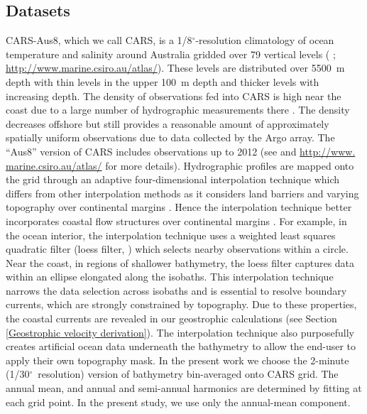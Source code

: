 \documentclass[preprint,3p,review,12pt]{elsarticle}
\newcommand{\dg}{$^{\circ}$}
\begin{document}
\subsection{Datasets} \label{Datasets}
CARS-Aus8, which we call CARS, is a 1/8\dg-resolution climatology of ocean temperature and salinity around Australia gridded over 79 vertical levels (\citeauthor{Ridgway2002} \citeyear{Ridgway2002}; \url{http://www.marine.csiro.au/atlas/}). These levels are distributed over \SI{5500}{\meter} depth with thin levels in the upper \SI{100}{\meter} depth and thicker levels with increasing depth. The density of observations fed into CARS is high near the coast due to a large number of hydrographic measurements there \citep{Ridgway2002}. The density decreases offshore but still provides a reasonable amount of approximately spatially uniform observations due to data collected by the Argo array. The ``Aus8'' version of CARS includes observations up to 2012 (see \citeauthor{Duran2015} \citeyear{Duran2015} and \url{http://www. marine.csiro.au/atlas/} for more details). Hydrographic profiles are mapped onto the grid through an adaptive four-dimensional interpolation technique which differs from other interpolation methods as it considers land barriers and varying topography over continental margins \citep{Ridgway2002}. Hence the interpolation technique better incorporates coastal flow structures over continental margins \citep{Ridgway2002}. For example, in the ocean interior, the interpolation technique uses a weighted least squares quadratic filter (loess filter, \citeauthor{Cleveland1988} \citeyear{Cleveland1988}) which selects nearby observations within a circle. Near the coast, in regions of shallower bathymetry, the loess filter captures data within an ellipse elongated along the isobaths. This interpolation technique narrows the data selection across isobaths and is essential to resolve boundary currents, which are strongly constrained by topography. Due to these properties, the coastal currents are revealed in our geostrophic calculations (see Section \ref{Geostrophic velocity derivation}). The interpolation technique also purposefully creates artificial ocean data underneath the bathymetry to allow the end-user to apply their own topography mask. In the present work we choose the 2-minute (1/30\dg~resolution) version of \citet{Smith1997} bathymetry bin-averaged onto CARS grid. The annual mean, and annual and semi-annual harmonics are determined by fitting at each grid point. In the present study, we use only the annual-mean component.
\end{document}
